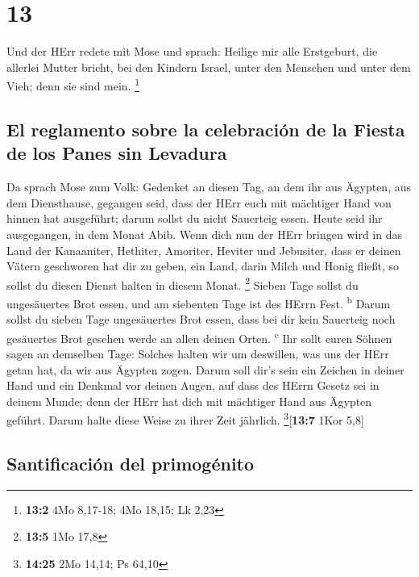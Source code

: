 \hypertarget{section-12}{%
\section{13}\label{section-12}}

 Und der HErr redete mit Mose und sprach: 
Heilige mir alle Erstgeburt, die allerlei Mutter bricht, bei den Kindern
Israel, unter den Menschen und unter dem Vieh; denn sie sind mein.
\footnote{\textbf{13:2} 4Mo 8,17-18; 4Mo 18,15; Lk 2,23}

\hypertarget{el-reglamento-sobre-la-celebraciuxf3n-de-la-fiesta-de-los-panes-sin-levadura}{%
\subsection{El reglamento sobre la celebración de la Fiesta de los Panes
sin
Levadura}\label{el-reglamento-sobre-la-celebraciuxf3n-de-la-fiesta-de-los-panes-sin-levadura}}

 Da sprach Mose zum Volk: Gedenket an diesen Tag, an dem
ihr aus Ägypten, aus dem Diensthause, gegangen seid, dass der HErr euch
mit mächtiger Hand von hinnen hat ausgeführt; darum sollst du nicht
Sauerteig essen.  Heute seid ihr ausgegangen, in dem Monat
Abib.  Wenn dich nun der HErr bringen wird in das Land der
Kanaaniter, Hethiter, Amoriter, Heviter und Jebusiter, dass er deinen
Vätern geschworen hat dir zu geben, ein Land, darin Milch und Honig
fließt, so sollst du diesen Dienst halten in diesem Monat. \footnote{\textbf{13:5}
  1Mo 17,8}  Sieben Tage sollst du ungesäuertes Brot
essen, und am siebenten Tage ist des HErrn Fest. \textsuperscript{b}
 Darum sollst du sieben Tage ungesäuertes Brot essen, dass
bei dir kein Sauerteig noch gesäuertes Brot gesehen werde an allen
deinen Orten. \textsuperscript{c}  Ihr sollt euren Söhnen
sagen an demselben Tage: Solches halten wir um deswillen, was uns der
HErr getan hat, da wir aus Ägypten zogen.  Darum soll
dir's sein ein Zeichen in deiner Hand und ein Denkmal vor deinen Augen,
auf dass des HErrn Gesetz sei in deinem Munde; denn der HErr hat dich
mit mächtiger Hand aus Ägypten geführt.  Darum halte
diese Weise zu ihrer Zeit jährlich. \footnote{\textbf{14:25} 2Mo 14,14;
  Ps 64,10}{[}\textbf{13:7} 1Kor 5,8{]}

\hypertarget{santificaciuxf3n-del-primoguxe9nito}{%
\subsection{Santificación del
primogénito}\label{santificaciuxf3n-del-primoguxe9nito}}

